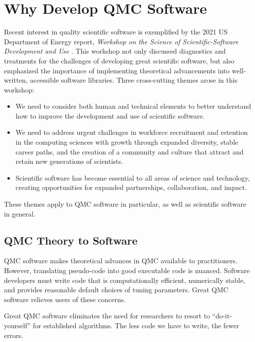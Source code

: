 \documentclass[graybox]{svmult}
\begin{document}
\section{Why Develop QMC Software} \label{CDHJS_sec:why_we_need_software}

Recent interest in quality scientific software is exemplified by the 2021 US Department of Energy report, \emph{Workshop on the Science of Scientific-Software Development and Use} \cite{ASCR-SSSDU, osti_1846008}. This workshop not only discussed diagnostics and treatments for the challenges of developing great scientific software, but also emphasized the importance of implementing theoretical advancements into well-written, accessible software libraries. Three cross-cutting themes arose in this workshop:
\begin{itemize}
    \item  We need to consider both human and technical elements to better understand how to improve the development and use of scientific software.

    \item We need to address urgent challenges in workforce recruitment and retention in the computing sciences with growth through expanded diversity, stable career paths, and the creation of a community and culture that attract and retain new generations of scientists.

    \item Scientific software has become essential to all areas of science and technology, creating opportunities for expanded partnerships, collaboration, and impact.
\end{itemize}
These themes apply to QMC software in particular, as well as scientific software in general.

\subsection{QMC Theory to Software}

QMC software makes theoretical advances in QMC available to practitioners. However, translating pseudo-code into good executable code is nuanced.  Software developers must write code that is computationally efficient, numerically stable, and provides reasonable default choices of tuning parameters. Great QMC software relieves users of these concerns.

Great QMC software eliminates the need for researchers to resort to  ``do-it-yourself'' for established algorithms.  The less code we have to write, the fewer errors.
\end{document}
